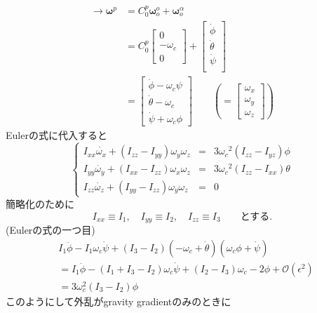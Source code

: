 \documentclass[class=article, crop=false, dvipdfmx, fleqn]{standalone}
\begin{document}
\begin{align}
\rightarrow 
\bm{\omega}^p & =
C_0^p \bm{\omega}_o^o + 
\bm{\omega}_o^\alpha\\
& =
C_0^p 
\begin{bmatrix}
0 \\
-\omega_c \\
0 
\end{bmatrix} + 
\begin{bmatrix} 
\dot{\phi} \\
\dot{\theta} \\ 
\dot{\psi} \\
\end{bmatrix}\\
& = 
\begin{bmatrix}
\dot{\phi} - \omega_c \psi \\
\dot{\theta} - \omega_c \\
\dot{\psi} + \omega_c \phi
\end{bmatrix}\qquad
\left(=
\begin{bmatrix}
\omega_x\\
\omega_y\\
\omega_z
\end{bmatrix}
\right)
\end{align}
Eulerの式に代入すると
\begin{equation}
\left\{
\begin{array}{lcl}
I_{xx} \dot{\omega_x} 
+ (I_{zz} - I_{yy})\omega_y \omega_z 
&=& 3 {\omega_c}^2 (I_{zz} - I_{yz})\phi \\
I_{yy} \dot{\omega_y} 
+ (I_{xx} - I_{zz})\omega_x \omega_z 
&=& 3{\omega_c}^2 (I_{zz} - I_{xx}) \theta \\
I_{zz} \dot{\omega_z} 
+ (I_{yy} - I_{zz}) \omega_y \omega_z 
&=& 0
\end{array}
\right.
\end{equation}
簡略化のために
\begin{equation}
I_{xx}\equiv I_1,\quad
I_{yy}\equiv I_2,\quad
I_{zz}\equiv I_3\qquad
\text{とする.}
\end{equation}
(Eulerの式の一つ目)
\begin{align}
&I_1\ddot{\phi}-
I_1\omega_c\dot{\psi}+
(I_3-I_2)(-\omega_c+\dot{\theta})
(\omega_c\phi+\dot{\psi})\\
&=I_1\ddot{\phi}-(I_1+I_3-I_2)
\omega_c\dot{\psi}+
(I_2-I_3)\omega_c-2\phi+
\mathcal{O}(\epsilon^2)\\
&=3\omega_c^2(I_3-I_2)\phi
\end{align}
このようにして外乱がgravity gradientのみのときに
\end{document}
